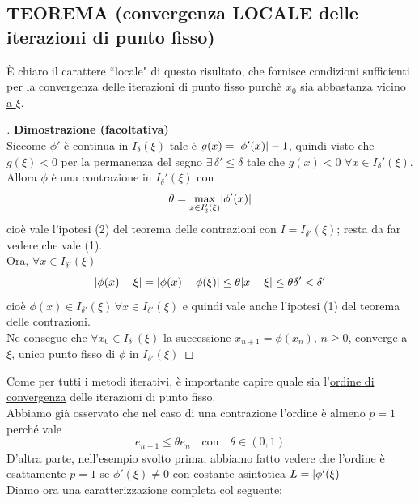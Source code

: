 \documentclass[12pt]{article}
\DeclarePairedDelimiter{\abs}{\lvert}{\rvert}
\begin{document}
\subsection{TEOREMA (convergenza LOCALE delle iterazioni di punto fisso)}
\begin{center}
\end{center}
È chiaro il carattere ``locale" di questo risultato, che fornisce
condizioni sufficienti per la convergenza delle iterazioni di punto fisso purchè $x_0$ \uline{sia abbastanza vicino a $\xi$}.
\newline 
\begin{proof}[\unskip\nopunct]
\textbf{Dimostrazione (facoltativa)}\\
Siccome $\phi'$ è continua in $I_{\delta}(\xi)$ tale è $g(x)=\abs{\phi'(x)}-1$, quindi visto che $g(\xi)<0$ per la permanenza del segno $\exists \, \delta'\le \delta$ tale che $g(x)<0$ $\forall x\in I_{\delta}'(\xi)$. Allora $\phi$ è una contrazione in $I_{\delta}'(\xi)$ con 
\[\theta=\max_{x \in I_{\delta}'(\xi)} \abs{\phi'(x)}\]
cioè vale l'ipotesi (2) del teorema delle contrazioni con $I=I_{\delta'}(\xi)$; resta da far vedere che vale (1).\\
Ora, $\forall x \in I_{\delta'}(\xi)$
\[ \abs{\phi(x) - \xi} = \abs{\phi(x) - \phi(\xi)} \leq \theta \abs{x-\xi} \leq \theta \delta' < \delta' \]
cioè $\phi(x) \in I_{\delta'}(\xi)\, \forall x \in I_{\delta'}(\xi)$ e quindi vale anche l'ipotesi (1) del teorema delle contrazioni. \\
Ne consegue che $\forall x_0 \in I_{\delta'}(\xi)$ la successione $x_{n+1} = \phi(x_n), \, n \ge 0$, converge a $\xi$, unico punto fisso di $\phi$ in $I_{\delta'}(\xi)$
\end{proof}

\bigskip
Come per tutti i metodi iterativi, è importante capire quale sia l'\uline{ordine di convergenza} delle iterazioni di punto fisso.\\
Abbiamo già osservato che nel caso di una contrazione l'ordine è almeno $p=1$ perché vale \[e_{n+1}\leq\theta e_n \quad \text{con} \quad \theta \in (0,1)\]
D'altra parte, nell'esempio svolto prima, abbiamo fatto vedere che l'ordine è esattamente $p=1$ se $\phi'(\xi)\neq 0$ con costante asintotica $L=\abs{\phi'(\xi)}$\\
Diamo ora una caratterizzazione completa col seguente:
\end{document}
